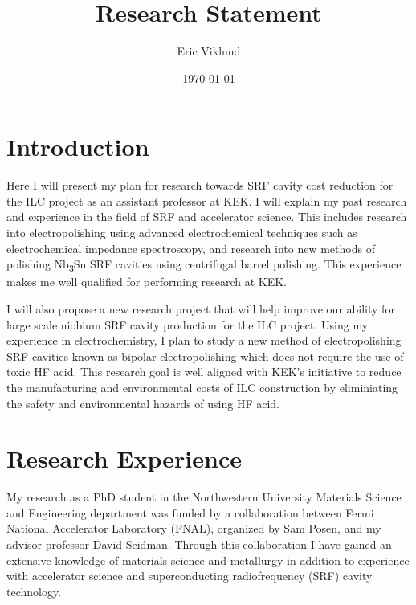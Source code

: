 \documentclass[]{revtex4-2}
\begin{document}
\title{Research Statement}
\author{Eric Viklund}


\date{\today}


\maketitle

\section{Introduction}

    Here I will present my plan for research towards SRF cavity cost reduction for the ILC project as an assistant professor at KEK. I will explain my past research and experience in the field of SRF and accelerator science. This includes research into electropolishing using advanced electrochemical techniques such as electrochemical impedance spectroscopy, and research into new methods of polishing Nb\textsubscript{3}Sn SRF cavities using centrifugal barrel polishing. This experience makes me well qualified for performing research at KEK.

    I will also propose a new research project that will help improve our ability for large scale niobium SRF cavity production for the ILC project. Using my experience in electrochemistry, I plan to study a new method of electropolishing SRF cavities known as bipolar electropolishing which does not require the use of toxic HF acid. This research goal is well aligned with KEK's initiative to reduce the manufacturing and environmental costs of ILC construction by eliminiating the safety and environmental hazards of using HF acid.  

\section{Research Experience}

    My research as a PhD student in the Northwestern University Materials Science and Engineering department was funded by a collaboration between Fermi National Accelerator Laboratory (FNAL), organized by Sam Posen, and my advisor professor David Seidman. Through this collaboration I have gained an extensive knowledge of materials science and metallurgy in addition to experience with accelerator science and superconducting radiofrequency (SRF) cavity technology. 
\end{document}
